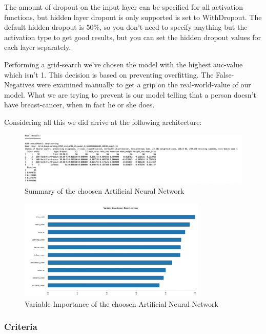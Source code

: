 \documentclass[]{article}
\begin{document}
The amount of dropout on the input layer can be specified for all
activation functions, but hidden layer dropout is only supported is set
to WithDropout. The default hidden dropout is 50\%, so you don't need to
specify anything but the activation type to get good results, but you
can set the hidden dropout values for each layer separately.

Performing a grid-search we've chosen the model with the highest
auc-value which isn't 1. This decision is based on preventing
overfitting. The False-Negatives were examined manually to get a grip on
the real-world-value of our model. What we are trying to prevent is our
model telling that a person doesn't have breast-cancer, when in fact he
or she does.

Considering all this we did arrive at the following architecture:

\begin{figure}
    \centering
    \includegraphics[width=1\textwidth]{images/model_details.png}
    \caption{Summary of the choosen Artificial Neural Network}
    \label{fig:model_details}
\end{figure}

\begin{figure}
    \centering
    \includegraphics[width=0.8\textwidth]{images/variable_importance.png}
    \caption{Variable Importance of the choosen Artificial Neural Network}
    \label{fig:variable_importance}
\end{figure}

\subsubsection{Criteria}\label{criteria}
\end{document}
